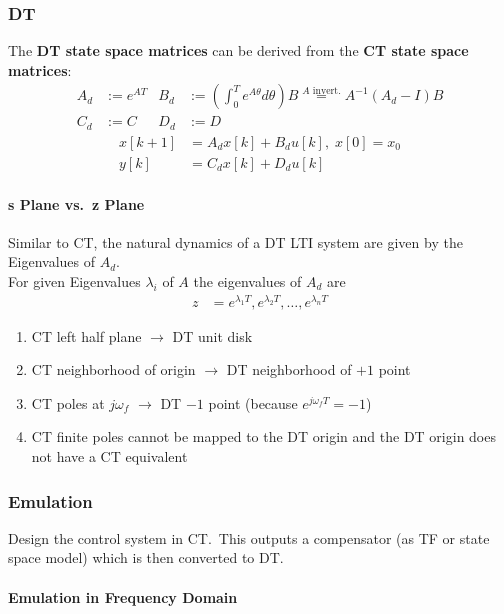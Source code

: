 \subsubsection{DT}
The \textbf{DT state space matrices} can be derived from the \textbf{CT state space matrices}:
\noindent\begin{align*}
    A_d & :=e^{AT} & B_d & :=\left(\int_0^T {e^{A\theta}}d\theta\right)B \overset{A \text{ invert.}}{=} A^{-1}\left(A_d-I\right)B \\
    C_d & :=C      & D_d & :=D
\end{align*}
\noindent\begin{align*}
    x[k+1] & =A_d x[k]+B_d u[k], \; x[0]=x_0 \\
    y[k]   & =C_d x[k]+D_d u[k]
\end{align*}
\paragraph{s Plane vs.\ z Plane}
Similar to CT, the natural dynamics of a DT LTI system are given by the Eigenvalues of $A_d$.\\
For given Eigenvalues $\lambda_i$ of $A$ the eigenvalues of $A_d$ are
\noindent\begin{align*}
    z & =e^{\lambda_1T},e^{\lambda_2T},\ldots,e^{\lambda_{n}T}
\end{align*}

\begin{enumerate}
    \item CT left half plane $\rightarrow$ DT unit disk
    \item CT neighborhood of origin $\rightarrow$ DT neighborhood of $+1$ point
    \item CT poles at $j\omega_f$ $\rightarrow$ DT $-1$ point (because $e^{j\omega_{f}T}=-1$)
    \item CT finite poles cannot be mapped to the DT origin and the DT origin does not have a CT equivalent
\end{enumerate}
\subsubsection{Emulation}
Design the control system in CT.\ This outputs a compensator (as TF or state space model) which is then converted to DT.\
\paragraph{Emulation in Frequency Domain}

